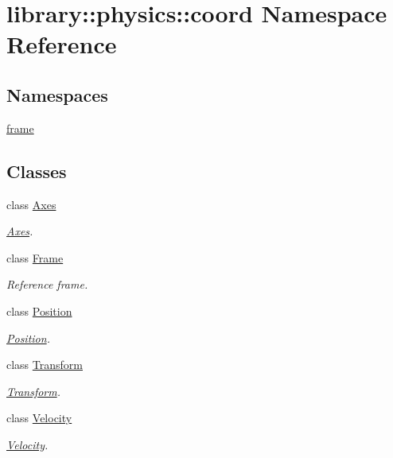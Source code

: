\hypertarget{namespacelibrary_1_1physics_1_1coord}{}\section{library\+:\+:physics\+:\+:coord Namespace Reference}
\label{namespacelibrary_1_1physics_1_1coord}
\subsection*{Namespaces}
\begin{DoxyCompactItemize}
\item 
 \hyperlink{namespacelibrary_1_1physics_1_1coord_1_1frame}{frame}
\end{DoxyCompactItemize}
\subsection*{Classes}
\begin{DoxyCompactItemize}
\item 
class \hyperlink{classlibrary_1_1physics_1_1coord_1_1_axes}{Axes}
\begin{DoxyCompactList}\small\item\em \hyperlink{classlibrary_1_1physics_1_1coord_1_1_axes}{Axes}. \end{DoxyCompactList}\item 
class \hyperlink{classlibrary_1_1physics_1_1coord_1_1_frame}{Frame}
\begin{DoxyCompactList}\small\item\em Reference frame. \end{DoxyCompactList}\item 
class \hyperlink{classlibrary_1_1physics_1_1coord_1_1_position}{Position}
\begin{DoxyCompactList}\small\item\em \hyperlink{classlibrary_1_1physics_1_1coord_1_1_position}{Position}. \end{DoxyCompactList}\item 
class \hyperlink{classlibrary_1_1physics_1_1coord_1_1_transform}{Transform}
\begin{DoxyCompactList}\small\item\em \hyperlink{classlibrary_1_1physics_1_1coord_1_1_transform}{Transform}. \end{DoxyCompactList}\item 
class \hyperlink{classlibrary_1_1physics_1_1coord_1_1_velocity}{Velocity}
\begin{DoxyCompactList}\small\item\em \hyperlink{classlibrary_1_1physics_1_1coord_1_1_velocity}{Velocity}. \end{DoxyCompactList}\end{DoxyCompactItemize}
